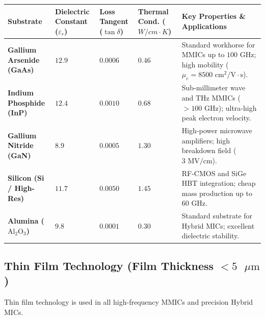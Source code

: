 \documentclass[12pt,a4paper]{article}
\renewcommand{\arraystretch}{1.45}
\begin{document}
\par\vspace{6pt}\noindent
\begingroup
\renewcommand{\arraystretch}{1.4}%
\begin{tabularx}{\linewidth}{|>{\raggedright\arraybackslash\bfseries}p{2.5cm}|>{\centering\arraybackslash}X|>{\centering\arraybackslash}X|>{\centering\arraybackslash}X|>{\raggedright\arraybackslash}X|}
\hline
\textbf{Substrate} & \textbf{Dielectric Constant ($\varepsilon_r$)} & \textbf{Loss Tangent ($\tan\delta$)} & \textbf{Thermal Cond. ($W/cm\cdot K$)} & \textbf{Key Properties \& Applications} \\
\hline
Gallium Arsenide (GaAs) & $12.9$ & $0.0006$ & $0.46$ & Standard workhorse for MMICs up to $100\text{ GHz}$; high mobility ($\mu_e = 8500\text{ cm}^2/\text{V}\cdot\text{s}$). \\
\hline
Indium Phosphide (InP) & $12.4$ & $0.0010$ & $0.68$ & Sub-millimeter wave and THz MMICs ($>100\text{ GHz}$); ultra-high peak electron velocity. \\
\hline
Gallium Nitride (GaN) & $8.9$ & $0.0005$ & $1.30$ & High-power microwave amplifiers; high breakdown field ($3\text{ MV/cm}$). \\
\hline
Silicon (Si / High-Res) & $11.7$ & $0.0050$ & $1.45$ & RF-CMOS and SiGe HBT integration; cheap mass production up to $60\text{ GHz}$. \\
\hline
Alumina ($\text{Al}_2\text{O}_3$) & $9.8$ & $0.0001$ & $0.30$ & Standard substrate for Hybrid MICs; excellent dielectric stability. \\
\hline
\end{tabularx}
\endgroup

\subsection{Thin Film Technology (Film Thickness \texorpdfstring{$< 5\text{ }\mu\text{m}$}{< 5 um})}
Thin film technology is used in all high-frequency MMICs and precision Hybrid MICs.
\end{document}
